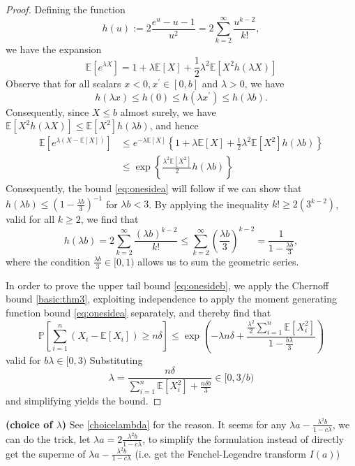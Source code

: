\documentclass{article}
\newcommand{\bfs}[1]{\textbf{({#1})}}
\begin{document}
\begin{proof}
Defining the function
$$
h(u):=2 \frac{e^{u}-u-1}{u^{2}}=2 \sum_{k=2}^{\infty} \frac{u^{k-2}}{k !},
$$
we have the expansion
$$
\mathbb{E}\left[e^{\lambda X}\right]=1+\lambda \mathbb{E}[X]+\frac{1}{2} \lambda^{2} \mathbb{E}\left[X^{2} h(\lambda X)\right]
$$
Observe that for all scalars $x<0, x^{\prime} \in[0, b]$ and $\lambda>0$, we have
$$
h(\lambda x) \leq h(0) \leq h\left(\lambda x^{\prime}\right) \leq h(\lambda b) .
$$
Consequently, since $X \leq b$ almost surely, we have $\mathbb{E}\left[X^{2} h(\lambda X)\right] \leq \mathbb{E}\left[X^{2}\right] h(\lambda b)$, and hence
$$
\begin{aligned}
\mathbb{E}\left[e^{\lambda(X-\mathbb{E}[X])}\right] & \leq e^{-\lambda \mathbb{E}[X]}\left\{1+\lambda \mathbb{E}[X]+\frac{1}{2} \lambda^{2} \mathbb{E}\left[X^{2}\right] h(\lambda b)\right\} \\
& \leq \exp \left\{\frac{\lambda^{2} \mathbb{E}\left[X^{2}\right]}{2} h(\lambda b)\right\}
\end{aligned}
$$
Consequently, the bound \cref{eq:onesidea} will follow if we can show that $h(\lambda b) \leq\left(1-\frac{\lambda b}{3}\right)^{-1}$ for $\lambda b<3$. By applying the inequality $k ! \geq 2\left(3^{k-2}\right)$, valid for all $k \geq 2$, we find that
$$
h(\lambda b)=2 \sum_{k=2}^{\infty} \frac{(\lambda b)^{k-2}}{k !} \leq \sum_{k=2}^{\infty}\left(\frac{\lambda b}{3}\right)^{k-2}=\frac{1}{1-\frac{\lambda b}{3}},
$$
where the condition $\frac{\lambda b}{3} \in[0,1)$ allows us to sum the geometric series. 

In order to prove the upper tail bound \cref{eq:onesideb}, we apply the Chernoff bound \cref{basic:thm3}, exploiting independence to apply the moment generating function bound \cref{eq:onesidea} separately, and thereby find that
$$
\mathbb{P}\left[\sum_{i=1}^{n}\left(X_{i}-\mathbb{E}\left[X_{i}\right]\right) \geq n \delta\right] \leq \exp \left(-\lambda n \delta+\frac{\frac{\lambda^{2}}{2} \sum_{i=1}^{n} \mathbb{E}\left[X_{i}^{2}\right]}{1-\frac{b \lambda}{3}}\right)
$$
valid for $b \lambda \in[0,3)$
Substituting
$$
\lambda=\frac{n \delta}{\sum_{i=1}^{n} \mathbb{E}\left[X_{i}^{2}\right]+\frac{n \delta b}{3}} \in[0,3 / b)
$$
and simplifying yields the bound.
\end{proof}
\begin{rema}{\bfs{choice of $\lambda$}}
See \cref{choicelambda} for the reason. It seems for any $\lambda a - \frac{\lambda^{2} b}{1-c\lambda}$, we can do the trick, let $\lambda a=2\frac{\lambda^{2} b}{1-c\lambda}$, to simplify the formulation instead of directly get the superme of $\lambda a - \frac{\lambda^{2} b}{1-c\lambda}$ (i.e. get the Fenchel-Legendre transform $I(a)$)
\end{rema}
\end{document}
